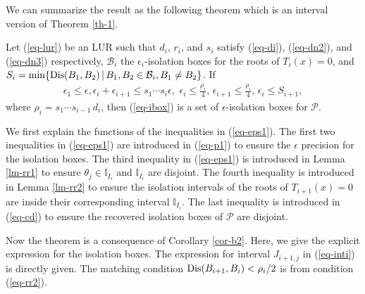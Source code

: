 \documentclass[amsthm]{JSC_LaTex_2007_Mar_12/elsart}
\def\bref#1{(\ref{#1})}
\def\PS{ {\mathcal{P}} }
\def\Dis{\hbox{\rm{Dis}}}
\begin{document}
We can summarize the result as the following theorem which is an
interval version of Theorem \ref{th-1}.


\begin{thm}\label{thm-eps}
Let \bref{eq-lur} be an LUR such that $d_i$, $r_i$, and $s_i$
satisfy \bref{eq-di}, \bref{eq-dn2}, and \bref{eq-dn3} respectively,
$\mathcal{B}_{i}$ the $\epsilon_i$-isolation boxes for the roots of
$T_i(x)=0$, and $S_{i} = \min\{\Dis(B_1, B_2)\,|\,
B_1,B_2\in\mathcal{B}_i, B_1\ne B_2 \}$. If
\begin{eqnarray}\label{eq-eps1}
\epsilon_1\le\epsilon, \epsilon_i+\epsilon_{i+1}\le s_1\cdots s_i
\epsilon,\,\,
 \epsilon_i\le \frac{\rho_i}{4},\,
 \epsilon_{i+1}\le \frac{\rho_i}{4},\,
 \epsilon_i\le S_{i+1}, \end{eqnarray} where $\rho_i=s_1\cdots s_{i-1}\,d_{i}$,
 then \bref{eq-ibox} is a set of $\epsilon$-isolation boxes  for $\PS$.
\end{thm}
\begin{pf}
We  first explain the functions of the inequalities in
\bref{eq-eps1}.
The first two inequalities in \bref{eq-eps1} are introduced in
\bref{eq-p1} to ensure the $\epsilon$ precision for the isolation
boxes.
The third inequality in \bref{eq-eps1} is introduced in Lemma
\ref{lm-rr1} to ensure $\theta_j\in\mathbb{I}_{I_i}$ and
$\mathbb{I}_{I_i}$ are disjoint.
The fourth inequality is introduced in Lemma \ref{lm-rr2} to ensure
the isolation intervals of the roots of $T_{i+1}(x)=0$ are inside
their corresponding interval $\mathbb{I}_{I_i}$.
The last inequality is introduced in \bref{eq-cd} to ensure the
recovered isolation boxes of $\mathcal{P}$ are disjoint.

Now the theorem is a consequence of Corollary \ref{cor-b2}. Here, we
give the explicit expression for the isolation boxes. The expression
for interval $J_{i+1,j}$ in \bref{eq-inti} is directly given. The
matching condition $\Dis(B_{i+1},B_{i}) < \rho_i/2$ is from
condition \bref{eq-rr2}.
\end{pf}
\end{document}
